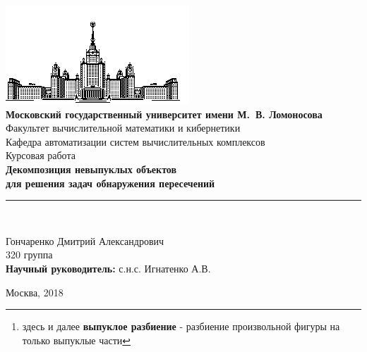 \documentclass[11pt,a4paper]{extarticle}
\begin{document}
	\begin{titlepage}
		\begin{centering}
			\includegraphics{msu}\\
				\large{
					\textbf{Московский государственный университет имени М.\ В. Ломоносова}\\
					Факультет вычислительной математики и кибернетики\\
					Кафедра автоматизации систем вычислительных комплексов\\[4cm]
				}
				\Large{
					Курсовая работа\\[0.5cm]
				}
				\Large{
					\textbf{Декомпозиция невыпуклых объектов\\ для решения задач обнаружения пересечений}\\					
				}
				\rule[0.3cm]{14cm}{0.02cm}\\[3cm]
		\end{centering}
		\begin{flushright}
			\large{
			Гончаренко Дмитрий Александрович\\
			320 группа \\

			\textbf{Научный руководитель:} с.н.с. Игнатенко А.В.\\
			}
		\end{flushright}
		\begin{center}
			\vfill 
			\large{
				Москва, 2018
			}
		\end{center}
	\end{titlepage}

	\begin{abstract}
		В данной работе поднимается актуальная проблема в компьютерной графике -- \emph{выпуклое разбиение 
		фигур}\footnote{здесь и далее \textbf{выпуклое разбиение} - разбиение произвольной фигуры на только выпуклые части}, 
		использующееся для дальнейшего поиска пересечений объекта в сцене. 
		Рассматриваются алгоритмы декомпозиции и методы решения поставленной задачи, в том числе иерархия ограничивающих объемов.
		Реализована декомпозиция сложнополигональных объектов на основе библиотеки HACD на языке C++. 
		Проведена сравнительная характеристика точного и приблизительного разбиений на примере 14 невыпуклых объектов.
	\end{abstract}
	
\end{document}
